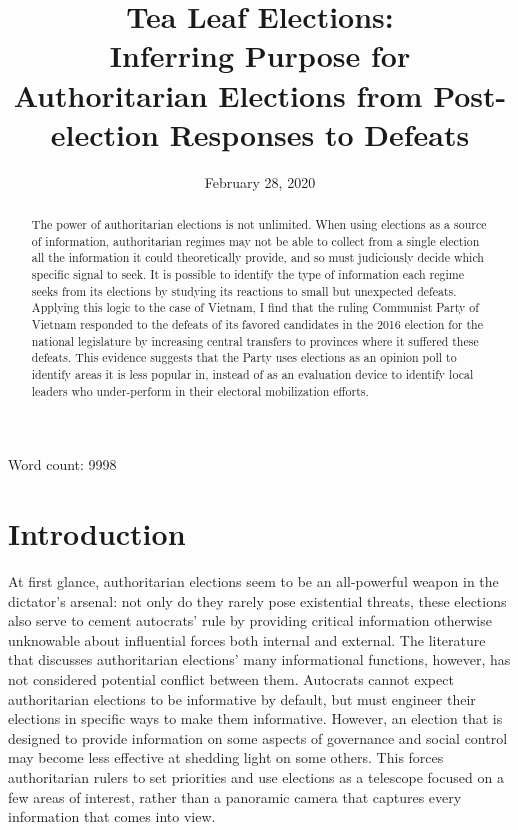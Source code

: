 \documentclass[12pt]{article}
\title{Tea Leaf Elections: \\
	Inferring Purpose for Authoritarian Elections from Post-election Responses to Defeats \\
	\vspace{2ex}
	\vphantom{Online Appendix}}
\date{February 28, 2020}
\newcommand{\1}{\mathbbm{1}}
\begin{document}
	

\maketitle
\thispagestyle{empty}
\doublespacing

\begin{abstract}
The power of authoritarian elections is not unlimited. When using elections as a source of information, authoritarian regimes may not be able to collect from a single election all the information it could theoretically provide, and so must judiciously decide which specific signal to seek. It is possible to identify the type of information each regime seeks from its elections by studying its reactions to small but unexpected defeats. Applying this logic to the case of Vietnam, I find that the ruling Communist Party of Vietnam responded to the defeats of its favored candidates in the 2016 election for the national legislature by increasing central transfers to provinces where it suffered these defeats. This evidence suggests that the Party uses elections as an opinion poll to identify areas it is less popular in, instead of as an evaluation device to identify local leaders who under-perform in their electoral mobilization efforts.
\end{abstract}

Word count: 9998


\newpage
{}

\section{Introduction}

At first glance, authoritarian elections seem to be an all-powerful weapon in the dictator's arsenal: not only do they rarely pose existential threats, these elections also serve to cement autocrats' rule by providing critical information otherwise unknowable about influential forces both internal and external. The literature that discusses authoritarian elections' many informational functions, however, has not considered potential conflict between them. Autocrats cannot expect authoritarian elections to be informative by default, but must engineer their elections in specific ways to make them informative. However, an election that is designed to provide information on some aspects of governance and social control may become less effective at shedding light on some others. This forces authoritarian rulers to set priorities and use elections as a telescope focused on a few areas of interest, rather than a panoramic camera that captures every information that comes into view.
\end{document}
